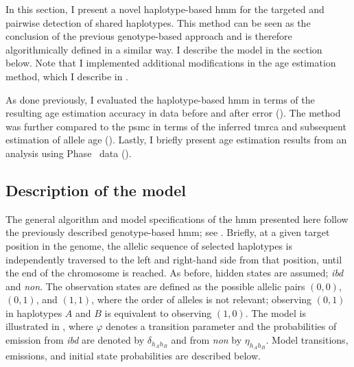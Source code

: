 In this section, I present a novel haplotype-based \gls{hmm} for the targeted and pairwise detection of shared haplotypes.
This method can be seen as the conclusion of the previous genotype-based approach and is therefore algorithmically defined in a similar way.
I describe the model in the section below.
Note that I implemented additional modifications in the age estimation method, which I describe in .

As done previously, I evaluated the haplotype-based \gls{hmm} in terms of the resulting age estimation accuracy in data before and after error ().
The method was further compared to the \gls{psmc} in terms of the inferred \gls{tmrca} and subsequent estimation of allele age ().
Lastly, I briefly present age estimation results from an analysis using  Phase~ data ().


%
\subsection{Description of the model}
%

The general algorithm and model specifications of the \gls{hmm} presented here follow the previously described genotype-based \gls{hmm}; see .
Briefly, at a given target position in the genome, the allelic sequence of  selected haplotypes is independently traversed to the left and right-hand side from that position, until the end of the chromosome is reached.
As before,  hidden states are assumed; \emph{ibd} and \emph{non}.
The observation states are defined as the possible allelic pairs $(0,0)$, $(0,1)$, and $(1,1)$, where the order of alleles is not relevant; \ie observing $(0,1)$ in haplotypes $A$ and $B$ is equivalent to observing $(1,0)$.
The model is illustrated in , where $\varphi$ denotes a transition parameter and the probabilities of emission from \emph{ibd} are denoted by $\delta_{h_A h_B}$ and from \emph{non} by $\eta_{h_A h_B}$.
Model transitions, emissions, and initial state probabilities are described below.


%

%

